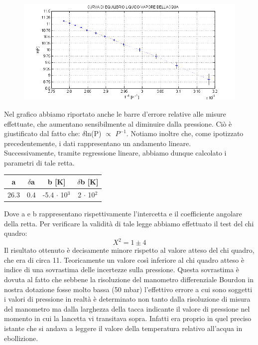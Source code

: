 \documentclass[11pt]{article}
\begin{document}
\begin{figure}[H]
\hspace{-38mm}
\includegraphics[scale=1.10]{pressione_temperatura.png}
\end{figure}

Nel grafico abbiamo riportato anche le barre d'errore relative alle misure effettuate, che aumentano sensibilmente al diminuire dalla pressione. Ciò è giustificato dal fatto che: $\delta$ln(P) $\propto$ $P^{-1}$. Notiamo inoltre che, come ipotizzato precedentemente, i dati rappresentano un andamento lineare.\\
Successivamente, tramite regressione lineare, abbiamo dunque calcolato i parametri di tale retta. 
\begin{center}
\begin{tabular}{|c|c|c|c|}
\hline
a & $\delta$a & b [\unit{K}] & $\delta$b [\unit{K}]\\
\hline
 26.3 & 0.4 & -5.4 $\cdot$ 10$^{3}$ & 2 $\cdot$ 10$^{2}$ \\
\hline
\end{tabular}
\end{center}
Dove a e b rappresentano rispettivamente l'intercetta e il coefficiente angolare della retta. Per verificare la validità di tale legge abbiamo effettuato il test del chi quadro:
\begin{equation}
X^2 = 1 \pm 4
\end{equation}
Il risultato ottenuto è decisamente minore rispetto al valore atteso del chi quadro, che era di circa 11. Teoricamente un valore così inferiore al chi quadro atteso è indice di una sovrastima delle incertezze sulla pressione. Questa sovrastima è dovuta al fatto che sebbene la risoluzione del manometro differenziale Bourdon in  nostra dotazione fosse molto bassa (50 \unit{mbar}) l'effettivo errore a cui sono soggetti i valori di pressione in realtà è determinato non tanto dalla risoluzione di misura del manometro ma dalla larghezza della tacca indicante il valore di pressione nel momento in cui la lancetta vi transitava sopra. Infatti era proprio in quel preciso istante che si andava a leggere il valore della temperatura relativo all'acqua in ebollizione. %
\end{document}
